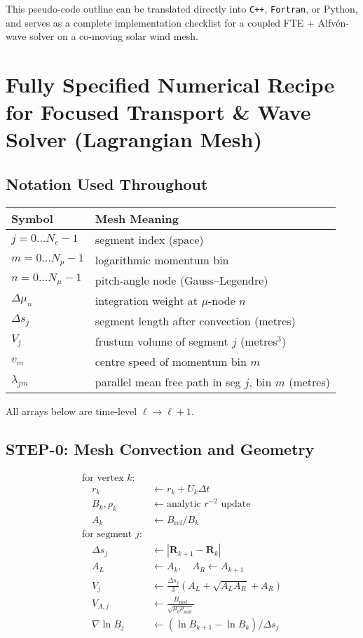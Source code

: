 {\bigskip

\noindent
This pseudo-code outline can be translated directly into \texttt{C++}, \texttt{Fortran}, or Python, and serves as a complete implementation checklist for a coupled FTE + Alfvén-wave solver on a co-moving solar wind mesh.

\section*{Fully Specified Numerical Recipe for Focused Transport \& Wave Solver (Lagrangian Mesh)}

\subsection*{Notation Used Throughout}

\begin{tabular}{@{}ll@{}}
\toprule
\textbf{Symbol} & \textbf{Mesh Meaning} \\
\midrule
$j = 0\ldots N_c{-}1$ & segment index (space) \\
$m = 0\ldots N_p{-}1$ & logarithmic momentum bin \\
$n = 0\ldots N_\mu{-}1$ & pitch-angle node (Gauss--Legendre) \\
$\Delta\mu_n$ & integration weight at $\mu$-node $n$ \\
$\Delta s_j$ & segment length after convection (metres) \\
$V_j$ & frustum volume of segment $j$ (metres$^3$) \\
$v_m$ & centre speed of momentum bin $m$ \\
$\lambda_{jm}$ & parallel mean free path in seg $j$, bin $m$ (metres) \\
\bottomrule
\end{tabular}

All arrays below are time-level $\ell \rightarrow \ell+1$.

\subsection*{STEP-0: Mesh Convection and Geometry}

\begin{align*}
\text{for vertex } k:& \\
\quad r_k &\leftarrow r_k + U_k \Delta t \\
\quad B_k, \rho_k &\leftarrow \text{analytic } r^{-2} \text{ update} \\
\quad A_k &\leftarrow B_\text{ref} / B_k \\
\text{for segment } j:& \\
\quad \Delta s_j &\leftarrow |\mathbf{R}_{k+1} - \mathbf{R}_k| \\
\quad A_L &\leftarrow A_k,\quad A_R \leftarrow A_{k+1} \\
\quad V_j &\leftarrow \frac{\Delta s_j}{3} (A_L + \sqrt{A_L A_R} + A_R) \\
\quad V_{A,j} &\leftarrow \frac{B_\text{mid}}{\sqrt{\mu_0 \rho_\text{mid}}} \\
\quad \nabla \ln B_j &\leftarrow (\ln B_{k+1} - \ln B_k)/\Delta s_j
\end{align*}

}
